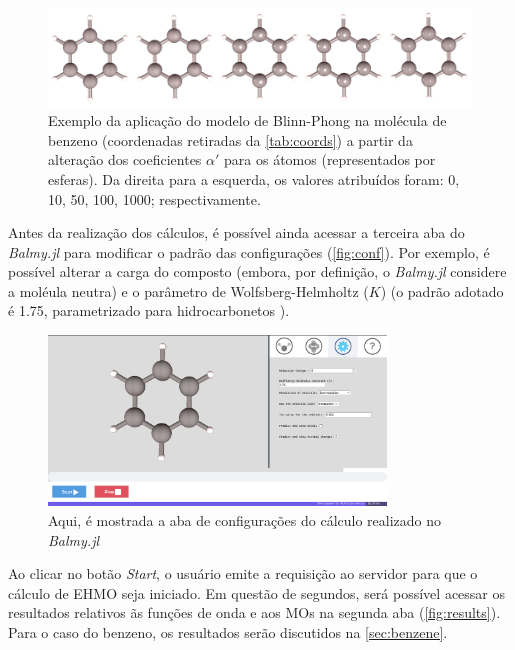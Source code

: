 
\begin{figure}[htb]
\caption{\label{fig:representations} Exemplo da aplicação do modelo de Blinn-Phong na molécula de benzeno (coordenadas retiradas da \autoref{tab:coords}) a partir da alteração dos coeficientes $\alpha'$ para os átomos (representados por esferas). Da direita para a esquerda, os valores atribuídos foram: 0, 10, 50, 100, 1000; respectivamente.}
	\begin{center}
		\includegraphics[width=1.0\textwidth]{images/shininess(1).png}
	\end{center}
\end{figure}

Antes da realização dos cálculos, é possível ainda acessar a terceira aba do \textit{Balmy.jl} para modificar o padrão das configurações (\autoref{fig:conf}). Por exemplo, é possível alterar a carga do composto (embora, por definição, o \textit{Balmy.jl} considere a moléula neutra) e o parâmetro de Wolfsberg-Helmholtz ($K$) (o padrão adotado é 1.75, parametrizado para hidrocarbonetos \autocite{Hoffmann1963}).

\begin{figure}[htb]
	\caption{\label{fig:conf} Aqui, é mostrada a aba de configurações do cálculo realizado no \textit{Balmy.jl}}
	\begin{center}
		\includegraphics[width=0.8\textwidth]{images/conf.png}
	\end{center}
\end{figure}


Ao clicar no botão \textit{Start}, o usuário emite a requisição ao servidor para que o cálculo de \gls{EHMO} seja iniciado. Em questão de segundos, será possível acessar os resultados relativos ãs funções de onda e aos \gls{MOs} na segunda aba (\autoref{fig:results}). Para o caso do benzeno, os resultados serão discutidos na \autoref{sec:benzene}.

